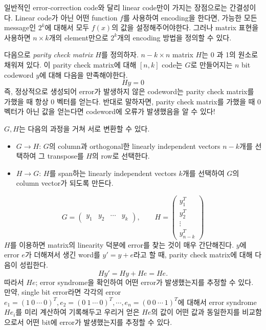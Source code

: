 일반적인 error-correction code와 달리 linear code만이 가지는 장점으로는 간결성이다. Linear code가 아닌 어떤 function $f$를 사용하여 encoding을 한다면, 가능한 모든 message인 $2^k$에 대해서 모두 $f(x)$의 값을 설정해주어야한다. 그러나 matrix 표현을 사용하면 $n\times k$개의 element만으로 $2^k$개의 encoding 방법을 정의할 수 있다.

다음으로 \textit{parity check matrix} $H$를 정의하자. $n-k \times n$ matrix $H$는 0 과 1의 원소로 채워져 있다. 이 parity check matrix에 대해 $[n, k]$ code는 $G$로 만들어지는 $n$ bit codeword $y$에 대해 다음을 만족해야한다. 
\begin{equation*}
    Hy = 0
\end{equation*}
즉, 정상적으로 생성되어 error가 발생하지 않은 codeword는 parity check matrix를 가했을 때 항상 0 벡터를 얻는다. 반대로 말하자면, parity check matrix를 가했을 때 0 벡터가 아닌 값을 얻는다면 codeword에 오류가 발생했음을 알 수 있다!

$G, H$는 다음의 과정을 거쳐 서로 변환할 수 있다.
\begin{itemize}
    \item $G \rightarrow H$: $G$의 column과 orthogonal한 linearly independent vectors $n-k$개를 선택하여 그 transpose를 $H$의 row로 선택한다.
    \item $H \rightarrow G$: $H$를 span하는 linearly independent vectors $k$개를 선택하여 $G$의 column vector가 되도록 만든다.
\end{itemize}
\begin{equation*}
    G = \begin{pmatrix} y_1 & y_2 & \cdots & y_k \end{pmatrix}, \qquad H = \begin{pmatrix} y_1^T \\ y_2^T \\ \vdots \\ y_{n-k}^T \end{pmatrix}
\end{equation*}
$H$를 이용하면 matrix의 linearity 덕분에 error를 찾는 것이 매우 간단해진다. $y$에 error $e$가 더해져서 생긴 word를 $y' = y+e$라고 할 때, parity check matrix에 대해 다음이 성립한다.
\begin{equation*}
    Hy' = Hy + He = He.
\end{equation*}
따라서 $He$; error syndrome을 확인하여 어떤 error가 발생했는지를 추정할 수 있다. 
만약, single bit error라면 각각의 error $e_1 = (1\ 0 \ \cdots \ 0)^T, e_2 = (0\ 1\ \cdots \ 0)^T, \cdots, e_n = (0\ 0\ \cdots \ 1)^T$에 대해서 error syndrome $He_i$를 미리 계산하여 기록해두고 우리거 얻은 $He$의 값이 어떤 값과 동일한지를 비교함으로서 어떤 bit에 error가 발생했는지를 추정할 수 있다.

